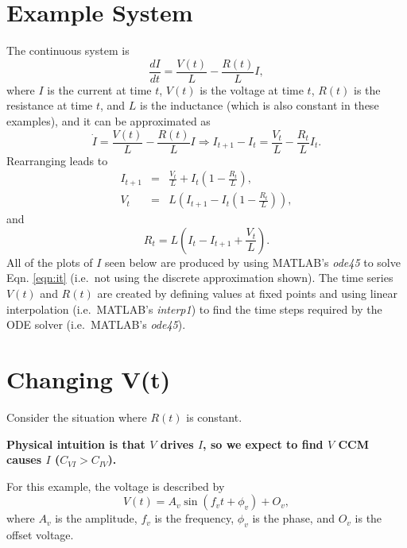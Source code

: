 \documentclass{article}
\begin{document}

\noindent\makebox[\linewidth]{\rule{\paperwidth}{0.4pt}}


\section{Example System}
The continuous system is
\begin{equation}
\label{eqn:it}
\frac{dI}{dt} = \frac{V(t)}{L} - \frac{R(t)}{L} I,
\end{equation}
where $I$ is the current at time $t$, $V(t)$ is the voltage at time $t$, $R(t)$ is the resistance at time $t$, and $L$ is the inductance (which is also constant in these examples), and it can be approximated as
\begin{equation}
\dot{I} = \frac{V(t)}{L} - \frac{R(t)}{L} I\Rightarrow I_{t+1}-I_t = \frac{V_t}{L} - \frac{R_t}{L} I_t.
\end{equation}
Rearranging leads to
\begin{eqnarray}
I_{t+1} &=& \frac{V_t}{L}+I_t\left(1-\frac{R_t}{L}\right),\\
V_t &=& L\left(I_{t+1}-I_t\left(1-\frac{R_t}{L}\right)\right),
\end{eqnarray}
and
\begin{equation}
R_t = L\left(I_t-I_{t+1}+\frac{V_t}{L}\right).
\end{equation}
All of the plots of $I$ seen below are produced by using MATLAB's {\em ode45} to solve Eqn. \ref{eqn:it} (i.e.\ not using the discrete approximation shown).  The time series $V(t)$ and $R(t)$ are created by defining values at fixed points and using linear interpolation (i.e.\ MATLAB's {\em interp1}) to find the time steps required by the ODE solver (i.e.\ MATLAB's {\em ode45}).  

\section{Changing V(t)}
Consider the situation where $R(t)$ is constant.
\begin{center}
{\large {\bf Physical intuition is that $V$ drives $I$, so we expect to find $V$ CCM causes $I$ ($C_{VI}>C_{IV}$).}}
\end{center}
For this example, the voltage is described by 
\begin{equation}
V(t) = A_v \sin\left(f_v t+\phi_v\right)+O_v,
\end{equation}
where $A_v$ is the amplitude, $f_v$ is the frequency, $\phi_v$ is the phase, and $O_v$ is the offset voltage.
\end{document}
